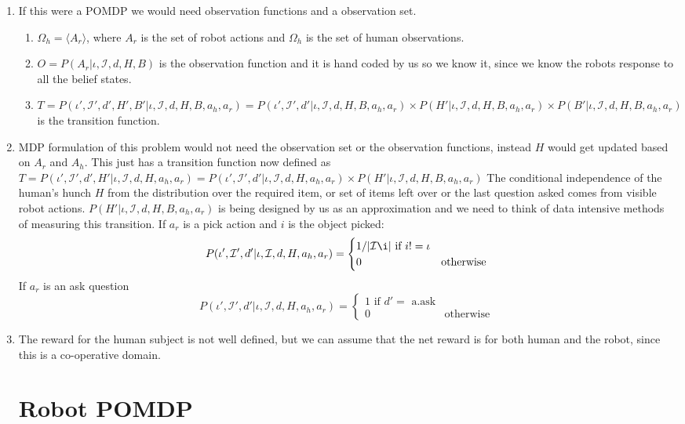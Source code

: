 \documentclass{article}
\begin{document}
\begin{enumerate}
	\item If this were a POMDP we would need observation functions and a observation set. \begin{enumerate}
	
	

	
	\item $\Omega_h  = \langle A_r \rangle$, where $A_r$ is the set of robot actions and $\Omega_h$ is the set of human observations.
	
	\item $O = P(A_r | \iota, \mathcal{I}, d, H, B)$ is the observation function and it is hand coded by us so we know it, since we know the robots response to all the belief states.
	
	\item $T = P(\iota', \mathcal{I}',d',H',B' |\iota, \mathcal{I},d,H,B, a_h,a_r) = P(\iota', \mathcal{I}',d'|\iota, \mathcal{I},d,H,B, a_h,a_r) \times P(H' |\iota, \mathcal{I},d,H,B, a_h,a_r) \times P(B' |\iota, \mathcal{I},d,H,B, a_h,a_r)$  is the transition function.
	
	\end{enumerate}
	
	\item MDP formulation of this problem would not need the observation set or the observation functions, instead $H$ would get updated based on $A_r$ and $A_h$. This just has a transition function now defined as\\
	$T = P(\iota', \mathcal{I}',d',H'|\iota, \mathcal{I},d,H, a_h,a_r) = P(\iota', \mathcal{I}',d'|\iota, \mathcal{I},d,H, a_h,a_r) \times P(H' |\iota, \mathcal{I},d,H,B, a_h,a_r)$
	The conditional independence of the human's hunch $H$ from the distribution over the required item, or set of items left over or the last question asked comes from visible robot actions.
	$P(H' |\iota, \mathcal{I},d,H,B, a_h,a_r)$ is being designed by us as an approximation and we need to think of data intensive methods of measuring this transition.
	If $a_r$ is a pick action and $i$ is the object picked:
	\begin{equation}
	P(\iota', \mathcal{I}',d'|\iota, \mathcal{I},d,H, a_h,a_r) =  \begin{cases}
	1/|\mathcal{I}\i| \text{ if $i!= \iota$} \\
	0 & \text{otherwise}
	\end{cases}
	\end{equation}
	If $a_r$ is an ask question 
	\begin{equation}
	P(\iota', \mathcal{I}',d'|\iota, \mathcal{I},d,H, a_h,a_r) =  \begin{cases}
	1 \text{ if $d' =$ a.ask} \\
	0 & \text{otherwise}
	\end{cases}
	\end{equation}
	
	\item The reward for the human subject is not well defined, but we can assume that the net reward is for both human and the robot, since this is a co-operative domain.
	
	
\section{Robot POMDP}



\end{enumerate}
\end{document}
